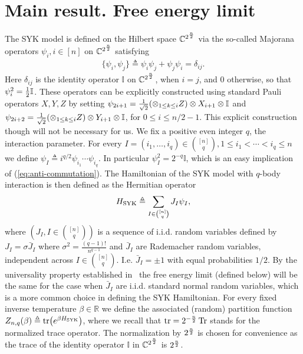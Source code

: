 \documentclass[12pt]{article}
\newcommand{\C}{\mathbb{C}}
\newcommand{\R}{\mathbb{R}}
\newcommand{\id}{\mathbb{I}}
\begin{document}
\section{Main result. Free energy limit}
The  SYK model is defined on the Hilbert space  $\C^{2^{n\over 2}}$ via 
the so-called Majorana  operators $\psi_i, i\in [n]$ on $\C^{2^{n\over 2}}$ satisfying 
\begin{align}\label{eq:anti-commutation}
\{\psi_i, \psi_j\}\triangleq \psi_i\psi_j+\psi_j\psi_i=\delta_{ij}. 
\end{align}
Here $\delta_{ij}$ is the identity operator $\id$ on $\C^{2^{n\over 2}}$,  when $i=j$, and $0$ otherwise, 
so that $\psi_i^2={1\over 2}\id$. These operators can be explicitly constructed using standard Pauli 
operators $X,Y,Z$ by setting $\psi_{2i+1}={1\over \sqrt{2}}(\otimes_{1\le k\le i}Z) \otimes X_{i+1}\otimes \id$
and $\psi_{2i+2}={1\over \sqrt{2}}(\otimes_{1\le k\le i}Z) \otimes Y_{i+1}\otimes \id$, for $0\le i\le n/2-1$. 
This explicit construction though will not be necessary for us. We fix a positive even integer $q$, the interaction parameter. 
For every $I=(i_1,\ldots,i_q)\in \binom{[n]}{q}, 1\le i_1<\cdots<i_q \le n$ we define $ \psi_I \triangleq i^{q/2}\psi_{i_1}\cdots \psi_{i_q}$. In particular $\psi_I^2=2^{-q}\id$,
which is an easy implication of (\ref{eq:anti-commutation}).
The Hamiltonian of the SYK model with $q$-body interaction is then defined as
the Hermitian operator
\begin{align}\label{eq:H-definition}
    H_{\rm SYK} \triangleq \sum_{I \in \binom{[n]}{q}} J_I \psi_I,
\end{align}
where $(J_I, I\in \binom{[n]}{q})$ is a sequence of i.i.d. random variables defined by $J_I=\sigma \bar J_I$ where $\sigma^2 = \frac{(q-1)!}{n^{q-1}}$
and $\bar J_I$ are Rademacher random variables, independent across $I\in \binom{[n]}{q}$. 
I.e. $\bar J_I=\pm 1$ with equal probabilities $1/2$.
By the universality property established in~\cite{anschuetz2025bounds} 
the free energy limit (defined below) will be the same for the case when $\bar J_I$ are i.i.d. standard normal
random variables, which is a more common choice in defining the SYK Hamiltonian.
For every fixed inverse temperature $\beta\in\R$ we define the associated (random) partition function 
$Z_{n,q}(\beta) \triangleq \tr(e^{\beta H_{\rm SYK}})$, where we recall that $\tr=2^{-{n\over 2}}\Tr$ stands for the normalized trace operator.
The normalization by $2^{n\over 2}$ is chosen for convenience as the trace of the identity operator $\id$ in $\C^{2^{n\over 2}}$ is $2^{n\over 2}$.
\end{document}
